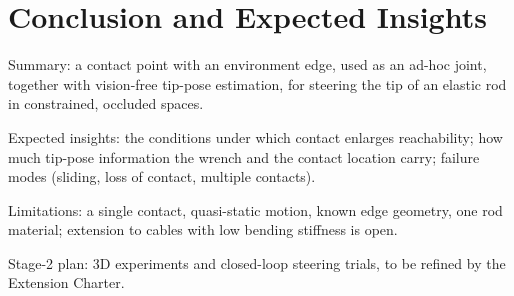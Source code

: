 \section{Conclusion and Expected Insights}
\label{sec:conclusion}

\begin{outline}
  \item Summary: a contact point with an environment edge, used as an ad-hoc
    joint, together with vision-free tip-pose estimation, for steering the tip
    of an elastic rod in constrained, occluded spaces.
  \item Expected insights: the conditions under which contact enlarges
    reachability; how much tip-pose information the wrench and the contact
    location carry; failure modes (sliding, loss of contact, multiple
    contacts).
  \item Limitations: a single contact, quasi-static motion, known edge
    geometry, one rod material; extension to cables with low bending stiffness
    is open.
  \item Stage-2 plan: 3D experiments and closed-loop steering trials, to be
    refined by the Extension Charter.
\end{outline}
